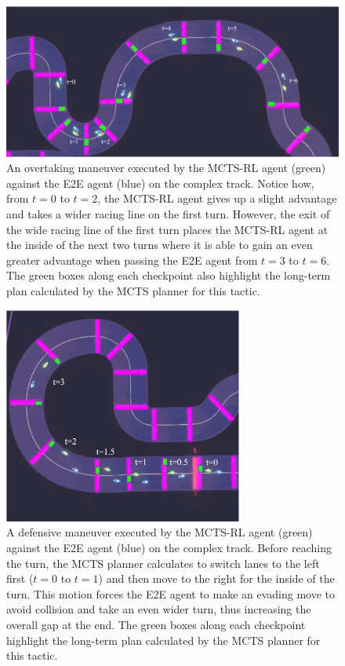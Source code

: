  \begin{figure}
  \centering
  \includegraphics[width=\textwidth]{Figures/MCTSRLOvertake.png}
  \caption [Overtaking maneuver by MCTS-RL controller.] {An overtaking maneuver executed by the MCTS-RL agent (green) against the E2E agent (blue) on the complex track. Notice how, from $t=0$ to $t=2$, the MCTS-RL agent gives up a slight advantage and takes a wider racing line on the first turn. However, the exit of the wide racing line of the first turn places the MCTS-RL agent at the inside of the next two turns where it is able to gain an even greater advantage when passing the E2E agent from $t=3$ to $t=6$. The green boxes along each checkpoint also highlight the long-term plan calculated by the MCTS planner for this tactic.}
  \label{fig:mctsrl:overtake}
\end{figure}
\begin{figure} [H]
    \centering
  \includegraphics[width=0.7\textwidth]{Figures/MCTSRLDefense.png}
  \caption[Defensive maneuver by MCTS-RL controller.]{A defensive maneuver executed by the MCTS-RL agent (green) against the E2E agent (blue) on the complex track.  Before reaching the turn, the MCTS planner calculates to switch lanes to the left first ($t=0$ to $t=1$) and then move to the right for the inside of the turn. This motion forces the E2E agent to make an evading move to avoid collision and take an even wider turn, thus increasing the overall gap at the end. The green boxes along each checkpoint highlight the long-term plan calculated by the MCTS planner for this tactic.}
  \label{fig:mctsrl:defense}
\end{figure}